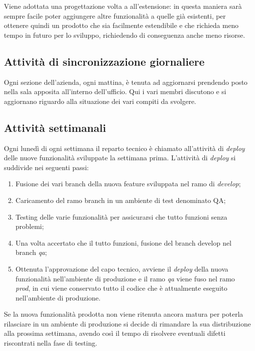 Viene adottata una progettazione volta a all'estensione: in questa
maniera sarà sempre facile poter aggiungere altre funzionalità a quelle già
esistenti, per ottenere quindi un prodotto che sia facilmente estendibile e che
richieda meno tempo in futuro per lo sviluppo, richiedendo di conseguenza anche
meno risorse.

\subsection{Attività di sincronizzazione giornaliere}

Ogni sezione dell'azienda, ogni mattina, è tenuta ad aggiornarsi prendendo posto
nella sala apposita all'interno dell'ufficio. Qui i vari membri discutono e si
aggiornano riguardo alla situazione dei vari compiti da svolgere.

\subsection{Attività settimanali}
\label{intro:attivitaSettimanali}

Ogni lunedì di ogni settimana il reparto tecnico è chiamato all'attività di
\textit{deploy} delle nuove funzionalità sviluppate la settimana prima.
L'attività di \textit{deploy} si suddivide nei seguenti passi:
\begin{enumerate}

\item Fusione dei vari branch della nuova feature sviluppata nel ramo di
\textit{develop};
\item Caricamento del ramo branch in un ambiente di test denominato QA;
\item Testing delle varie funzionalità per assicurarsi che tutto funzioni senza
problemi;
\item Una volta accertato che il tutto funzioni, fusione del branch develop nel
branch \textit{qa};
\item Ottenuta l'approvazione del capo tecnico, avviene il \textit{deploy}
della nuova funzionalità nell'ambiente di produzione e il ramo \textit{qa}
viene fuso nel ramo \textit{prod}, in cui viene conservato tutto il codice che
è attualmente eseguito nell'ambiente di produzione.
\end{enumerate}

Se la nuova funzionalità prodotta non viene ritenuta ancora matura per poterla
rilasciare in un ambiente di produzione si decide di rimandare la sua
distribuzione alla prossima settimana, avendo così il tempo di risolvere
eventuali difetti riscontrati nella fase di testing.
